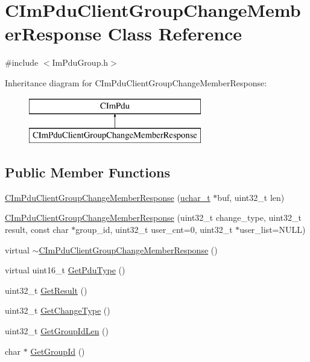 \hypertarget{class_c_im_pdu_client_group_change_member_response}{}\section{C\+Im\+Pdu\+Client\+Group\+Change\+Member\+Response Class Reference}
\label{class_c_im_pdu_client_group_change_member_response}


{\ttfamily \#include $<$Im\+Pdu\+Group.\+h$>$}

Inheritance diagram for C\+Im\+Pdu\+Client\+Group\+Change\+Member\+Response\+:\begin{figure}[H]
\begin{center}
\leavevmode
\includegraphics[height=2.000000cm]{class_c_im_pdu_client_group_change_member_response}
\end{center}
\end{figure}
\subsection*{Public Member Functions}
\begin{DoxyCompactItemize}
\item 
\hyperlink{class_c_im_pdu_client_group_change_member_response_af316ced7dec6c6bb8335004de31337c5}{C\+Im\+Pdu\+Client\+Group\+Change\+Member\+Response} (\hyperlink{base_2ostype_8h_a124ea0f8f4a23a0a286b5582137f0b8d}{uchar\+\_\+t} $\ast$buf, uint32\+\_\+t len)
\item 
\hyperlink{class_c_im_pdu_client_group_change_member_response_a015818b85f63d5125d0fa025dcb3a1c1}{C\+Im\+Pdu\+Client\+Group\+Change\+Member\+Response} (uint32\+\_\+t change\+\_\+type, uint32\+\_\+t result, const char $\ast$group\+\_\+id, uint32\+\_\+t user\+\_\+cnt=0, uint32\+\_\+t $\ast$user\+\_\+list=N\+U\+L\+L)
\item 
virtual \hyperlink{class_c_im_pdu_client_group_change_member_response_abc27d97638c99637422490f5ef807cdc}{$\sim$\+C\+Im\+Pdu\+Client\+Group\+Change\+Member\+Response} ()
\item 
virtual uint16\+\_\+t \hyperlink{class_c_im_pdu_client_group_change_member_response_ac5cb4e0f19d51c13f27f2666e2f88cf9}{Get\+Pdu\+Type} ()
\item 
uint32\+\_\+t \hyperlink{class_c_im_pdu_client_group_change_member_response_ab49403fc22fcbc4b9d83874c1be1eaf3}{Get\+Result} ()
\item 
uint32\+\_\+t \hyperlink{class_c_im_pdu_client_group_change_member_response_acfcc30a19473ad4721964e22b32258c3}{Get\+Change\+Type} ()
\item 
uint32\+\_\+t \hyperlink{class_c_im_pdu_client_group_change_member_response_a8cec9d995fd0103fcf0357d7e0c95fe9}{Get\+Group\+Id\+Len} ()
\item 
char $\ast$ \hyperlink{class_c_im_pdu_client_group_change_member_response_a1b111bcd3a0df3edff36538e7e3aa420}{Get\+Group\+Id} ()
\end{DoxyCompactItemize}
